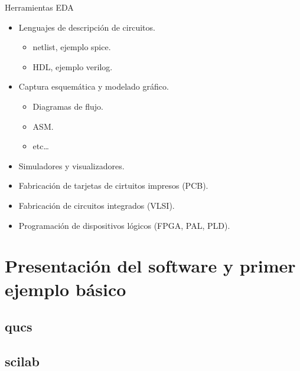 \documentclass{beamer}
\begin{document}
\begin{frame}{Herramientas EDA}
  \begin{itemize}
  \item Lenguajes de descripción de circuitos.
    \begin{itemize}
    \item netlist, ejemplo spice.
    \item HDL, ejemplo verilog.
    \end{itemize}
    \vspace{9pt}
  \item Captura esquemática y modelado gráfico.
    \begin{itemize}
    \item Diagramas de flujo.
    \item ASM.
    \item etc\dots{}
    \end{itemize}

    \vspace{9pt}
  \item Simuladores y visualizadores.
    \vspace{9pt}
  \item Fabricación de tarjetas de cirtuitos impresos (PCB).
  \item Fabricación de circuitos integrados (VLSI).
  \item Programación de dispositivos lógicos (FPGA, PAL, PLD).
  \end{itemize}
\end{frame}

\section{Presentación del software y primer ejemplo básico}

\subsection{qucs}

\begin{frame}
  
\end{frame}

\subsection{scilab}

\begin{frame}
  
\end{frame}
\end{document}
